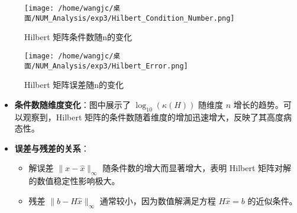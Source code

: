 \documentclass{article}
\begin{document}
\begin{enumerate}[itemsep=1em]
            \begin{figure}[h] %
                  \centering %
                  \begin{minipage}[t]{0.48\textwidth} %
                        \centering %
                        \texttt{[image: /home/wangjc/桌面/NUM\_Analysis/exp3/Hilbert\_Condition\_Number.png]} %
                        \caption{Hilbert 矩阵条件数随n的变化} %
                        \label{fig:Hilbert_Condition_Number} %
                  \end{minipage}
                  \hfill %
                  \begin{minipage}[t]{0.48\textwidth} %
                        \centering %
                        \texttt{[image: /home/wangjc/桌面/NUM\_Analysis/exp3/Hilbert\_Error.png]} %
                        \caption{Hilbert 矩阵误差随n的变化} %
                        \label{fig:Hilbert_Error} %
                  \end{minipage}
            \end{figure}
            \begin{itemize}
                  \item \textbf{条件数随维度变化}：图中展示了 \( \log_{10}(\kappa(H)) \) 随维度 \( n \) 增长的趋势。可以观察到，Hilbert 矩阵的条件数随着维度的增加迅速增大，反映了其高度病态性。
                  \item \textbf{误差与残差的关系}：
                        \begin{itemize}
                              \item 解误差 \( \|x - \hat{x}\|_{\infty} \) 随条件数的增大而显著增大，表明 Hilbert 矩阵对解的数值稳定性影响极大。
                              \item 残差 \( \|b - H \hat{x}\|_{\infty} \) 通常较小，因为数值解满足方程 \( H \hat{x} = b \) 的近似条件。
                        \end{itemize}

            \end{itemize}



\end{enumerate}
\end{document}
